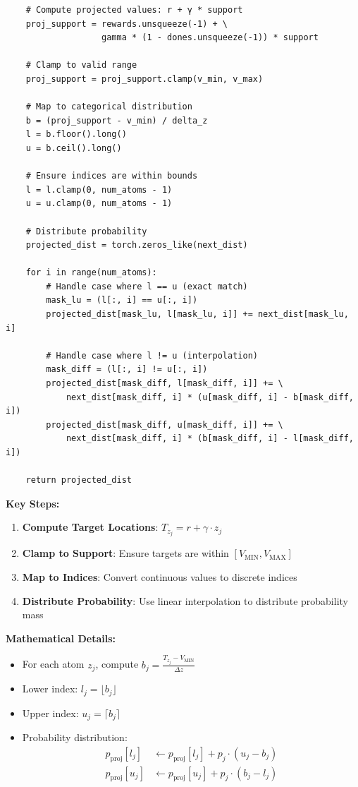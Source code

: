 \documentclass[12pt]{article}
\begin{document}
{{\begin{verbatim}
    # Compute projected values: r + γ * support
    proj_support = rewards.unsqueeze(-1) + \
                   gamma * (1 - dones.unsqueeze(-1)) * support
    
    # Clamp to valid range
    proj_support = proj_support.clamp(v_min, v_max)
    
    # Map to categorical distribution
    b = (proj_support - v_min) / delta_z
    l = b.floor().long()
    u = b.ceil().long()
    
    # Ensure indices are within bounds
    l = l.clamp(0, num_atoms - 1)
    u = u.clamp(0, num_atoms - 1)
    
    # Distribute probability
    projected_dist = torch.zeros_like(next_dist)
    
    for i in range(num_atoms):
        # Handle case where l == u (exact match)
        mask_lu = (l[:, i] == u[:, i])
        projected_dist[mask_lu, l[mask_lu, i]] += next_dist[mask_lu, i]
        
        # Handle case where l != u (interpolation)
        mask_diff = (l[:, i] != u[:, i])
        projected_dist[mask_diff, l[mask_diff, i]] += \
            next_dist[mask_diff, i] * (u[mask_diff, i] - b[mask_diff, i])
        projected_dist[mask_diff, u[mask_diff, i]] += \
            next_dist[mask_diff, i] * (b[mask_diff, i] - l[mask_diff, i])
    
    return projected_dist
\end{verbatim}

\textbf{Key Steps:}
\begin{enumerate}
\item \textbf{Compute Target Locations}: $T_{z_j} = r + \gamma \cdot z_j$
\item \textbf{Clamp to Support}: Ensure targets are within $[V_{\text{MIN}}, V_{\text{MAX}}]$
\item \textbf{Map to Indices}: Convert continuous values to discrete indices
\item \textbf{Distribute Probability}: Use linear interpolation to distribute probability mass
\end{enumerate}

\textbf{Mathematical Details:}
\begin{itemize}
\item For each atom $z_j$, compute $b_j = \frac{T_{z_j} - V_{\text{MIN}}}{\Delta z}$
\item Lower index: $l_j = \lfloor b_j \rfloor$
\item Upper index: $u_j = \lceil b_j \rceil$
\item Probability distribution:
\begin{align}
p_{\text{proj}}[l_j] &\leftarrow p_{\text{proj}}[l_j] + p_j \cdot (u_j - b_j) \\
p_{\text{proj}}[u_j] &\leftarrow p_{\text{proj}}[u_j] + p_j \cdot (b_j - l_j)
\end{align}
\end{itemize}

}}
\end{document}
